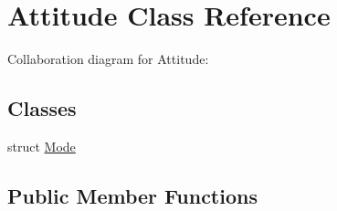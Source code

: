 \hypertarget{classAttitude}{
\section{Attitude Class Reference}
\label{classAttitude}
}
Collaboration diagram for Attitude:\subsection*{Classes}
\begin{DoxyCompactItemize}
\item 
struct \hyperlink{structAttitude_1_1Mode}{Mode}
\end{DoxyCompactItemize}
\subsection*{Public Member Functions}
